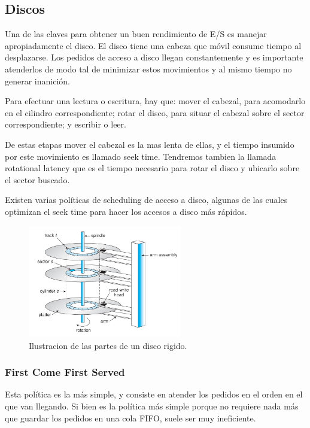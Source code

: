 \documentclass{article}
\begin{document}
\subsection{Discos}

Una de las claves para obtener un buen rendimiento de E/S es manejar apropiadamente el disco. El disco tiene una cabeza que móvil consume tiempo al desplazarse. Los pedidos de acceso a disco llegan constantemente y es importante atenderlos de modo tal de minimizar estos movimientos y al mismo tiempo no generar inanici\'on.

Para efectuar una lectura o escritura, hay que: mover el cabezal, para acomodarlo en el cilindro correspondiente; rotar el disco, para situar el cabezal sobre el sector correspondiente; y escribir o leer.

De estas etapas mover el cabezal es la mas lenta de ellas, y el tiempo insumido por este movimiento es llamado seek time. Tendremos tambien la llamada rotational latency que es el tiempo necesario para rotar el disco y ubicarlo sobre el sector buscado.

Existen varias pol\'iticas de scheduling de acceso a disco, algunas de las cuales optimizan el seek time para hacer los accesos a disco m\'as r\'apidos.

\begin{figure}[H]
    \centering
    \includegraphics[width=0.6\textwidth]{imgs/parts_hdd.png}
    \caption{Ilustracion de las partes de un disco rigido.}
    \label{fig:parts_hdd}
\end{figure}


\subsubsection{First Come First Served}

Esta pol\'itica es la m\'as simple, y consiste en atender los pedidos en el orden en el que van llegando. Si bien es la pol\'itica m\'as simple porque no requiere nada m\'as que guardar los pedidos en una cola FIFO, suele ser muy ineficiente.
\end{document}
